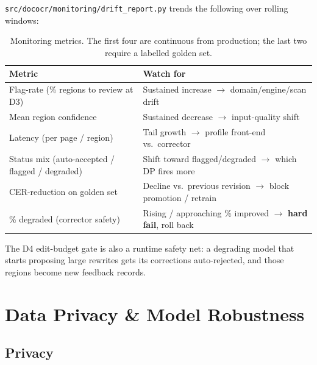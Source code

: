 \documentclass[12pt,a4paper]{article}
\begin{document}
\texttt{src/dococr/monitoring/drift\_report.py} trends the following over rolling windows:

\begin{table}[H]
\centering
\caption{Monitoring metrics. The first four are continuous from production; the last two require a labelled golden set.}
\small
\begin{tabularx}{\linewidth}{@{} l L @{}}
\toprule
\textbf{Metric} & \textbf{Watch for} \\
\midrule
Flag-rate (\% regions to review at D3) & Sustained increase $\rightarrow$ domain/engine/scan drift \\
Mean region confidence & Sustained decrease $\rightarrow$ input-quality shift \\
Latency (per page / region) & Tail growth $\rightarrow$ profile front-end vs.\ corrector \\
Status mix (auto-accepted / flagged / degraded) & Shift toward flagged/degraded $\rightarrow$ which DP fires more \\
CER-reduction on golden set & Decline vs.\ previous revision $\rightarrow$ block promotion / retrain \\
\% degraded (corrector safety) & Rising / approaching \% improved $\rightarrow$ \textbf{hard fail}, roll back \\
\bottomrule
\end{tabularx}
\end{table}

The D4 edit-budget gate is also a runtime safety net: a degrading model that starts proposing large rewrites gets its corrections auto-rejected, and those regions become new feedback records.

\section{Data Privacy \& Model Robustness}

\subsection{Privacy}
\end{document}
